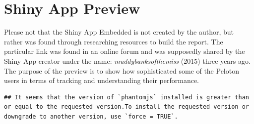 \documentclass[
]{article}
\begin{document}
\hypertarget{shiny-app-preview}{%
\section{Shiny App Preview}\label{shiny-app-preview}}

Please not that the Shiny App Embedded is not created by the author, but rather was found through researching resources to build the report. The particular link was found in an online forum and was supposedly shared by the Shiny App creator under the name: \emph{muddybanksofthemiss} (2015) three years ago. The purpose of the preview is to show how sophisticated some of the Peloton users in terms of tracking and understanding their performance.

\begin{verbatim}
## It seems that the version of `phantomjs` installed is greater than or equal to the requested version.To install the requested version or downgrade to another version, use `force = TRUE`.
\end{verbatim}
\end{document}
